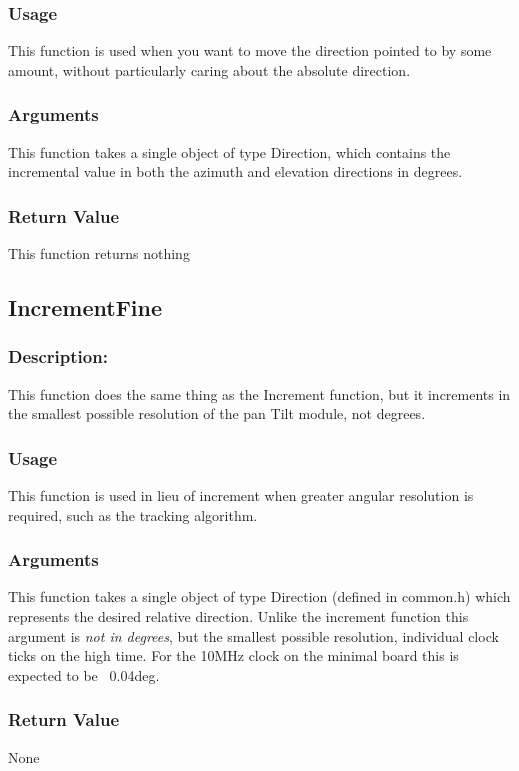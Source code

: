 \documentclass[]{report}
\begin{document}
\subsubsection{Usage}
This function is used when you want to move the direction pointed to by some amount, without particularly caring about the absolute direction.

\subsubsection{Arguments}
This function takes a single object of type Direction, which contains the incremental value in both the azimuth and elevation directions in degrees.

\subsubsection{Return Value}
This function returns nothing

\subsection{IncrementFine}
\subsubsection{Description:}
This function does the same thing as the Increment function, but it increments in the smallest possible resolution of the pan Tilt module, not degrees.

\subsubsection{Usage}
This function is used in lieu of increment when greater angular resolution is required, such as the tracking algorithm.

\subsubsection{Arguments}
This function takes a single object of type Direction (defined in common.h) which represents the desired relative direction. Unlike the increment function this argument is \emph{not in degrees}, but the smallest possible resolution, individual clock ticks on the high time. For the 10MHz clock on the minimal board this is expected to be ~0.04deg.

\subsubsection{Return Value}
None
\end{document}
